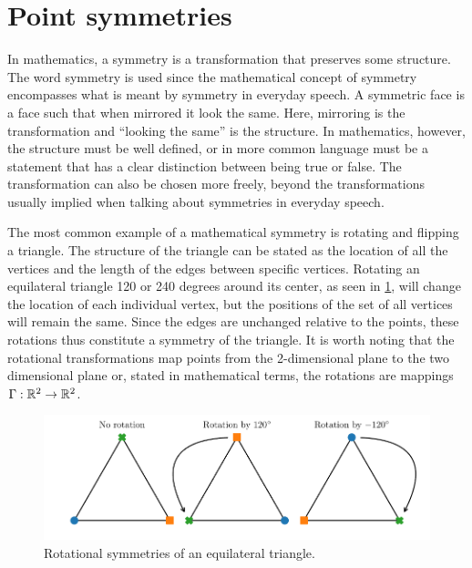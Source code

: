 \section{Point symmetries}

In mathematics, a symmetry is a transformation that preserves some structure.
The word symmetry is used since the mathematical concept of symmetry encompasses what is meant by symmetry in everyday speech.
A symmetric face is a face such that when mirrored it look the same.
Here, mirroring is the transformation and \enquote{looking the same} is the structure.
In mathematics, however, the structure must be well defined, or in more common language must be a statement that has a clear distinction between being true or false.
The transformation can also be chosen more freely, beyond the transformations usually implied when talking about symmetries in everyday speech.

The most common example of a mathematical symmetry is rotating and flipping a triangle.
The structure of the triangle can be stated as the location of all the vertices and the length of the edges between specific vertices.
Rotating an equilateral triangle 120 or 240 degrees around its center, as seen in \cref{fig:triangle-rotation}, will change the location of each individual vertex, but the positions of the set of all vertices will remain the same.
Since the edges are unchanged relative to the points, these rotations thus constitute a symmetry of the triangle.
It is worth noting that the rotational transformations map points from the 2-dimensional plane to the two dimensional plane or, stated in mathematical terms, the rotations are mappings \(\Gamma: \mathbb{R}^2 \to \mathbb{R}^2\).
\begin{figure}
  \centering
  \includegraphics[width=.95\textwidth]{images/triangles}
  \caption{Rotational symmetries of an equilateral triangle.}
  \label{fig:triangle-rotation}
\end{figure}

